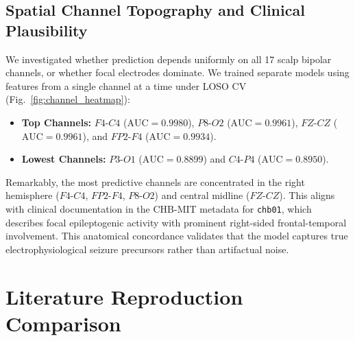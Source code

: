 \documentclass[10pt,journal,compsoc]{IEEEtran}
\begin{document}
\subsection{Spatial Channel Topography and Clinical Plausibility}
We investigated whether prediction depends uniformly on all 17 scalp bipolar channels, or whether focal electrodes dominate. We trained separate models using features from a single channel at a time under LOSO CV (Fig.~\ref{fig:channel_heatmap}):
\begin{itemize}
    \item \textbf{Top Channels:} $F4\text{-}C4$ ($\text{AUC} = 0.9980$), $P8\text{-}O2$ ($\text{AUC} = 0.9961$), $FZ\text{-}CZ$ ($\text{AUC} = 0.9961$), and $FP2\text{-}F4$ ($\text{AUC} = 0.9934$).
    \item \textbf{Lowest Channels:} $P3\text{-}O1$ ($\text{AUC} = 0.8899$) and $C4\text{-}P4$ ($\text{AUC} = 0.8950$).
\end{itemize}

Remarkably, the most predictive channels are concentrated in the right hemisphere ($F4\text{-}C4$, $FP2\text{-}F4$, $P8\text{-}O2$) and central midline ($FZ\text{-}CZ$). This aligns with clinical documentation in the CHB-MIT metadata for \texttt{chb01}, which describes focal epileptogenic activity with prominent right-sided frontal-temporal involvement. This anatomical concordance validates that the model captures true electrophysiological seizure precursors rather than artifactual noise.

\section{Literature Reproduction Comparison}
\end{document}
